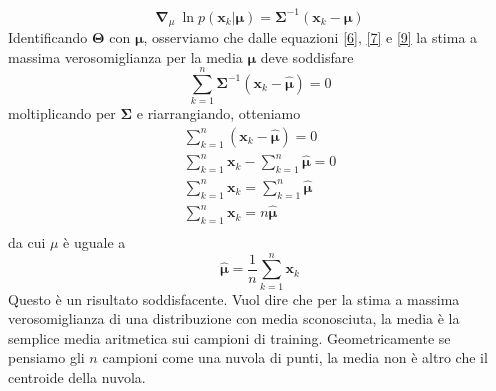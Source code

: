 \begin{equation}\label{9}
\mathbf{\nabla}_{\mu} \ \ln p(\mathbf{x}_k|\mathbf{\mu}) = \mathbf{\Sigma}^{-1} (\mathbf{x}_k - \mathbf{\mu})
\end{equation}
Identificando $\mathbf{\Theta}$ con $\mathbf{\mu}$, osserviamo che dalle equazioni \ref{6}, \ref{7} e \ref{9} la stima a massima verosomiglianza per la media $\mathbf{\mu}$ deve soddisfare 
\begin{equation}
\sum_{k=1}^n \mathbf{\Sigma}^{-1} (\mathbf{x}_k - \mathbf{\hat{\mu}}) = 0
\end{equation}
moltiplicando per $\mathbf{\Sigma}$ e riarrangiando, otteniamo
\begin{gather}
\sum_{k=1}^n (\mathbf{x}_k - \mathbf{\hat{\mu}}) = 0\\
\sum_{k=1}^n \mathbf{x}_k -  \sum_{k=1}^n \mathbf{\hat{\mu}} = 0\\
\sum_{k=1}^n \mathbf{x}_k  =  \sum_{k=1}^n \mathbf{\hat{\mu}}\\
\sum_{k=1}^n \mathbf{x}_k  =  n \mathbf{\hat{\mu}}\\
\end{gather}
da cui $\mu$ è uguale a 
\begin{equation}
\mathbf{\hat{\mu}} = \frac{1}{n}\sum_{k=1}^n \mathbf{x}_k
\end{equation}
Questo è un risultato soddisfacente. Vuol dire che per la stima a massima verosomiglianza di una distribuzione con media sconosciuta, la media è la semplice media aritmetica sui campioni di training. Geometricamente se pensiamo gli $n$ campioni come una nuvola di punti, la media non è altro che il centroide della nuvola.  

